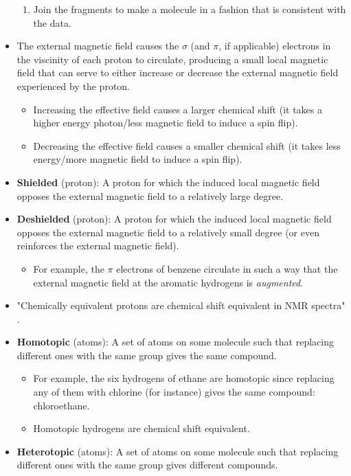 \documentclass[../notes.tex]{subfiles}
\begin{document}
\begin{itemize}
\begin{enumerate}
        \item Join the fragments to make a molecule in a fashion that is consistent with the data.
    \end{enumerate}
    \item The external magnetic field causes the $\sigma$ (and $\pi$, if applicable) electrons in the viscinity of each proton to circulate, producing a small local magnetic field that can serve to either increase or decrease the external magnetic field experienced by the proton.
    \begin{itemize}
        \item Increasing the effective field causes a larger chemical shift (it takes a higher energy photon/less magnetic field to induce a spin flip).
        \item Decreasing the effective field causes a smaller chemical shift (it takes less energy/more magnetic field to induce a spin flip).
    \end{itemize}
    \item \textbf{Shielded} (proton): A proton for which the induced local magnetic field opposes the external magnetic field to a relatively large degree. 
    \item \textbf{Deshielded} (proton): A proton for which the induced local magnetic field opposes the external magnetic field to a relatively small degree (or even reinforces the external magnetic field).
    \begin{itemize}
        \item For example, the $\pi$ electrons of benzene circulate in such a way that the external magnetic field at the aromatic hydrogens is \emph{augmented}.
    \end{itemize}
    \item "Chemically equivalent protons are chemical shift equivalent in  NMR spectra" \parencite[403]{bib:SolomonsEtAl}.
    \item \textbf{Homotopic} (atoms): A set of atoms on some molecule such that replacing different ones with the same group gives the same compound.
    \begin{itemize}
        \item For example, the six hydrogens of ethane are homotopic since replacing any of them with chlorine (for instance) gives the same compound: chloroethane.
        \item Homotopic hydrogens are chemical shift equivalent.
    \end{itemize}
    \item \textbf{Heterotopic} (atoms): A set of atoms on some molecule such that replacing different ones with the same group gives different compounds.

\end{itemize}
\end{document}
